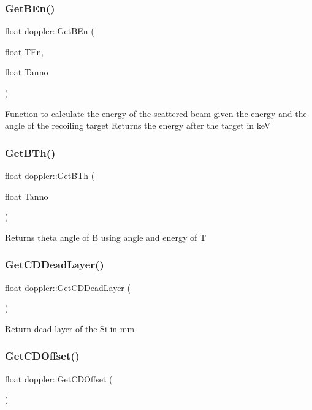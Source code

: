 \subsubsection{\texorpdfstring{Get\+B\+En()}{GetBEn()}}
{\footnotesize\ttfamily float doppler\+::\+Get\+B\+En (\begin{DoxyParamCaption}\item[{float}]{T\+En,  }\item[{float}]{Tanno }\end{DoxyParamCaption})}

Function to calculate the energy of the scattered beam given the energy and the angle of the recoiling target Returns the energy after the target in keV \mbox{\label{classdoppler_ac834d80156ae80009b508ae41fedde3d}} 
\subsubsection{\texorpdfstring{Get\+B\+Th()}{GetBTh()}}
{\footnotesize\ttfamily float doppler\+::\+Get\+B\+Th (\begin{DoxyParamCaption}\item[{float}]{Tanno }\end{DoxyParamCaption})}

Returns theta angle of B using angle and energy of T \mbox{\label{classdoppler_a2c1aef6db4ad3fc0c98e91d995992706}} 
\subsubsection{\texorpdfstring{Get\+C\+D\+Dead\+Layer()}{GetCDDeadLayer()}}
{\footnotesize\ttfamily float doppler\+::\+Get\+C\+D\+Dead\+Layer (\begin{DoxyParamCaption}{ }\end{DoxyParamCaption})}

Return dead layer of the Si in mm \mbox{\label{classdoppler_ac7725720fab82af5a5a6f02041bc9483}} 
\subsubsection{\texorpdfstring{Get\+C\+D\+Offset()}{GetCDOffset()}}
{\footnotesize\ttfamily float doppler\+::\+Get\+C\+D\+Offset (\begin{DoxyParamCaption}{ }\end{DoxyParamCaption})}

